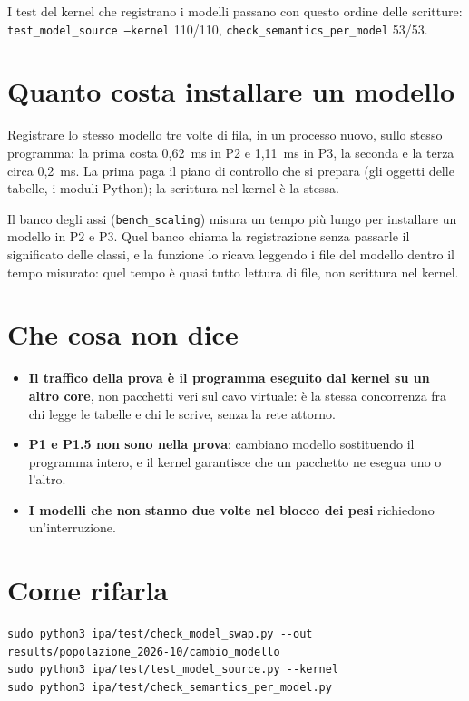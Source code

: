 \documentclass[11pt,a4paper,oneside]{report}
\begin{document}
I test del kernel che registrano i modelli passano con questo ordine delle
scritture: \texttt{test\_model\_source --kernel} 110/110,
\texttt{check\_semantics\_per\_model} 53/53.

\section{Quanto costa installare un modello}

Registrare lo stesso modello tre volte di fila, in un processo nuovo, sullo stesso
programma: la prima costa 0,62~ms in P2 e 1,11~ms in P3, la seconda e la terza
circa 0,2~ms. La prima paga il piano di controllo che si prepara (gli oggetti
delle tabelle, i moduli Python); la scrittura nel kernel è la stessa.

\begin{prima}
Il banco degli assi (\texttt{bench\_scaling}) misura un tempo più lungo per
installare un modello in P2 e P3. Quel banco chiama la registrazione senza
passarle il significato delle classi, e la funzione lo ricava leggendo i file del
modello dentro il tempo misurato: quel tempo è quasi tutto lettura di file, non
scrittura nel kernel.
\end{prima}

\section{Che cosa non dice}

\begin{itemize}
  \item \textbf{Il traffico della prova è il programma eseguito dal kernel su un
        altro core}, non pacchetti veri sul cavo virtuale: è la stessa
        concorrenza fra chi legge le tabelle e chi le scrive, senza la rete
        attorno.
  \item \textbf{P1 e P1.5 non sono nella prova}: cambiano modello sostituendo il
        programma intero, e il kernel garantisce che un pacchetto ne esegua uno
        o l'altro.
  \item \textbf{I modelli che non stanno due volte nel blocco dei pesi}
        richiedono un'interruzione.
\end{itemize}

\section{Come rifarla}

\begin{lstlisting}
sudo python3 ipa/test/check_model_swap.py --out results/popolazione_2026-10/cambio_modello
sudo python3 ipa/test/test_model_source.py --kernel
sudo python3 ipa/test/check_semantics_per_model.py
\end{lstlisting}
\end{document}
